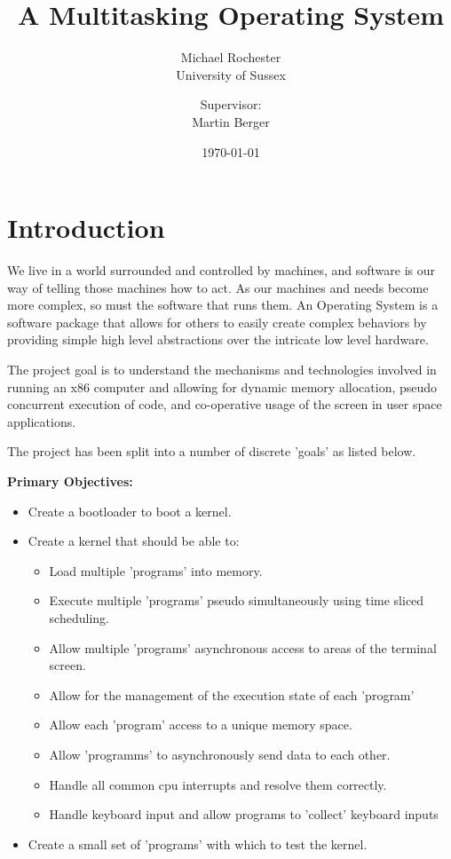 \documentclass[a4paper]{report}
\title{A Multitasking Operating System}
\date{\today}
\author{Michael Rochester\\ University of Sussex
        \and Supervisor:\\ Martin Berger}
\begin{document}
\titlespacing*{\chapter}{0pt}{-50pt}{20pt}
\titleformat{\chapter}[display]{\normalfont\huge\bfseries}{\chaptertitlename\ \thechapter}{20pt}{\Huge}


\maketitle

\tableofcontents
\listoffigures

\chapter*{Introduction}
We live in a world surrounded and controlled by machines, and software is our way of telling those machines how to act. As our machines and needs become more complex, so must the software that runs them. An Operating System is a software package that allows for others to easily create complex behaviors by providing simple high level abstractions over the intricate low level hardware.

The project goal is to understand the mechanisms and technologies involved in running an x86 computer and allowing for dynamic memory allocation, pseudo concurrent execution of code, and co-operative usage of the screen in user space applications.

The project has been split into a number of discrete 'goals' as listed below.


\textbf {Primary Objectives:}

\begin{itemize}
\item Create a bootloader to boot a kernel.
\item Create a kernel that should be able to:
\begin{itemize}
\item Load multiple 'programs' into memory.
\item Execute multiple 'programs' pseudo simultaneously using time sliced scheduling.
\item Allow multiple 'programs' asynchronous access to areas of the terminal screen.
\item Allow for the management of the execution state of each 'program'
\item Allow each 'program' access to a unique memory space.
\item Allow 'programms' to asynchronously send data to each other.
\item Handle all common cpu interrupts and resolve them correctly.
\item Handle keyboard input and allow programs to 'collect' keyboard inputs
\end{itemize}
\item Create a small set of 'programs' with which to test the kernel.
\end{itemize}
\end{document}
